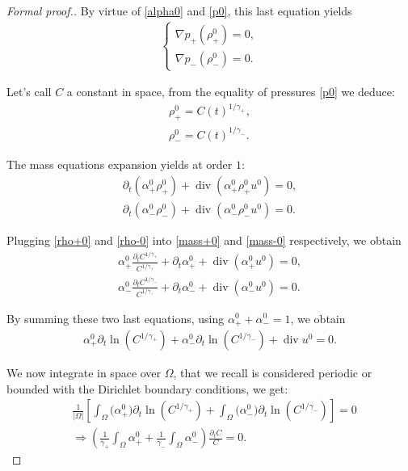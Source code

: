\documentclass[11pt, twoside, a4paper]{article}
\theoremstyle{plain}
\theoremstyle{remark}
\numberwithin{equation}{section}
\renewcommand{\div}{\operatorname{div}}
\newcommand{\dt}{\partial_t}
\begin{document}
\begin{proof} [Formal proof.]
By virtue of \eqref{alpha0} and \eqref{p0}, this last equation yields
\begin{align*}
    \left\{
        \begin{array}{l}
              \nabla p_+(\rho_+^0) = 0, \\
              \nabla p_-(\rho_-^0) = 0.
        \end{array}
    \right.
\end{align*}

Let's call $C$ a constant in space, from the equality of pressures \eqref{p0} we deduce:
\begin{align}
    \rho_+^0 = C(t)^{1/\gamma_+},\label{rho+0}\\
    \rho_-^0 = C(t)^{1/\gamma_-}.\label{rho-0}
\end{align}

The mass equations expansion yields at order $1$:
\begin{align}
    \dt (\alpha_+^0 \rho_+^0) + \div (\alpha_+^0 \rho_+^0 u^0) = 0,\label{mass+0}\\
    \dt (\alpha_-^0 \rho_-^0) + \div (\alpha_-^0 \rho_-^0 u^0) = 0.\label{mass-0}
\end{align}

Plugging \eqref{rho+0} and \eqref{rho-0} into \eqref{mass+0} and \eqref{mass-0} respectively, we obtain
\begin{align*}
    \alpha_+^0 \frac{\dt C^{1/\gamma_+}}{C^{1/\gamma_+}} + \dt \alpha_+^0 + \div(\alpha_+^0 u^0) = 0,\\
    \alpha_-^0 \frac{\dt C^{1/\gamma_-}}{C^{1/\gamma_-}} + \dt \alpha_-^0 + \div(\alpha_-^0 u^0) = 0.
\end{align*}

By summing these two last equations, using $\alpha_+^0 + \alpha_-^0 =1$, we obtain
\begin{align}
    \alpha_+^0 \dt \ln (C^{1/\gamma_+}) + \alpha_-^0 \dt \ln(C^{1/\gamma_-}) + \div u^0 = 0.\label{fordivu}
\end{align}

We now integrate in space over $\Omega$, that we recall is considered periodic or bounded with the Dirichlet boundary conditions, we get:
\begin{align*}
    &\frac{1}{\lvert \Omega \rvert} \left[ \int_\Omega \Big(  \alpha_+^0  \Big) \dt \ln (C^{1/\gamma_+}) + \int_\Omega \Big( \alpha_-^0 \Big) \dt \ln(C^{1/\gamma_-}) \right] = 0\\
    &\Rightarrow \left( \frac{1}{\gamma_+} \int_\Omega \alpha_+^0 + \frac{1}{\gamma_-} \int_\Omega \alpha_-^0 \right) \frac{\dt C}{C} = 0.
\end{align*}


\end{proof}
\end{document}

